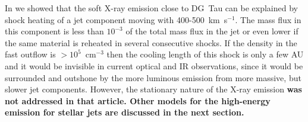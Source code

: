 In \citet{2009A&A...493..579G} we showed that the soft X-ray emission close to DG~Tau can be explained by shock heating of a jet component moving with 400-500~km~s$^{-1}$. The mass flux in this component is less than $10^{-3}$ of the total mass flux in the jet or even lower if the same material is reheated in several consecutive shocks. If the density in the fast outflow is $>10^5$~cm$^{-3}$ then the cooling length of this shock is only a few AU and it would be invisible in current optical and IR observations, since it would be surrounded and outshone by the more luminous emission from more massive, but slower jet components. However, the stationary nature of the X-ray emission \textbf{was not addressed in that article. Other models for the high-energy emission for stellar jets are discussed in the next section.}
